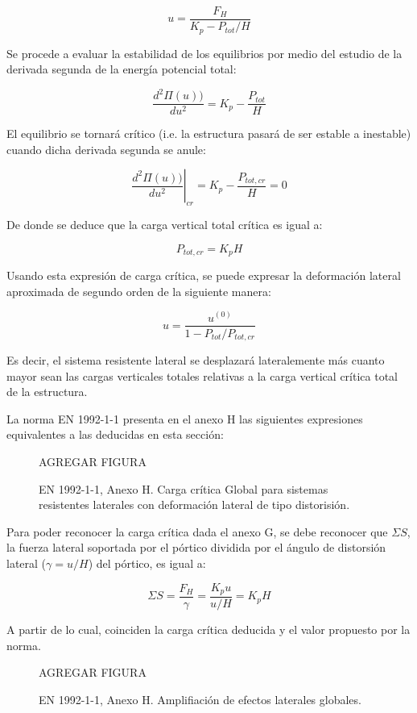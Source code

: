 $$u=\frac{F_H}{K_p - P_{tot}/H}$$

Se procede a evaluar la estabilidad de los equilibrios por medio del estudio de la derivada segunda de la energía potencial total:

$$\frac{d^2 \Pi(u))}{d u^2} = K_p-\frac{P_{tot}}{H}$$

El equilibrio se tornará crítico (i.e. la estructura pasará de ser estable a inestable) cuando dicha derivada segunda se anule:

$$\left.\frac{d^2 \Pi(u))}{d u^2}\right|_{cr} = K_p-\frac{P_{tot,cr}}{H}=0$$

De donde se deduce que la carga vertical total crítica es igual a:

$$P_{tot,cr} = K_p H$$

Usando esta expresión de carga crítica, se puede expresar la deformación lateral aproximada de segundo orden de la siguiente manera:

$$u=\frac{u^{(0)}}{1 - P_{tot}/P_{tot,cr}}$$

Es decir, el sistema resistente lateral se desplazará lateralemente más cuanto mayor sean las cargas verticales totales relativas a la carga vertical crítica total de la estructura.

La norma EN 1992-1-1 presenta en el anexo H las siguientes expresiones equivalentes a las deducidas en esta sección:

\begin{figure}[htb]
	\centering
	AGREGAR FIGURA
	\caption{EN 1992-1-1, Anexo H. Carga crítica Global para sistemas resistentes laterales con deformación lateral de tipo distorisión.}
	\label{fig:EN_Pcrit}
\end{figure}

Para poder reconocer la carga crítica dada el anexo G, se debe reconocer que $\Sigma S$, la fuerza lateral soportada por el pórtico dividida por el ángulo de distorsión lateral ($\gamma = u / H$) del pórtico, es igual a:

$$ \Sigma S = \frac{F_H}{\gamma} = \frac{K_p u}{u/H} = K_p H  $$

A partir de lo cual, coinciden la carga crítica deducida y el valor propuesto por la norma. 

\begin{figure}[htb]
	\centering
	AGREGAR FIGURA
	\caption{EN 1992-1-1, Anexo H. Amplifiación de efectos laterales globales.}
\label{fig:EN_Pcrit}
\end{figure}

